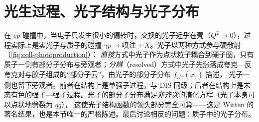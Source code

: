 
\section{光生过程、光子结构与光子分布}\label{sec:coll-photo}

在 $ep$ 碰撞中，当电子只发生很小的偏转时，交换的光子近乎在壳（$Q^2\to0$），过程实际上是实光子与质子的碰撞 $\gamma p\to\text{喷注}+X$。光子以两种方式参与硬散射（\cref{fig:coll-photoproduction}）：
\emph{直接}方式中光子作为点状粒子耦合到硬子图，只有质子一侧有部分子分布与旁观者；\emph{分辨}（resolved）方式中光子先涨落成夸克—反夸克对与胶子组成的“部分子云”，由光子的部分子分布 $f_{j/\gamma}(x_\gamma)$ 描述，
光子一侧也留下旁观者。前者在结构上是单强子过程，与 DIS 同级；后者在结构上是末态有色的强子—强子过程。光子的部分子分布满足\emph{非齐次}的演化方程（光子本身可以点状地劈裂为 $q\bar q$），
这使光子结构函数的领头部分完全可算——这是 Witten 的著名结果，也是本节唯一的严格陈述。最后讨论相反的问题：质子中的光子分布。

